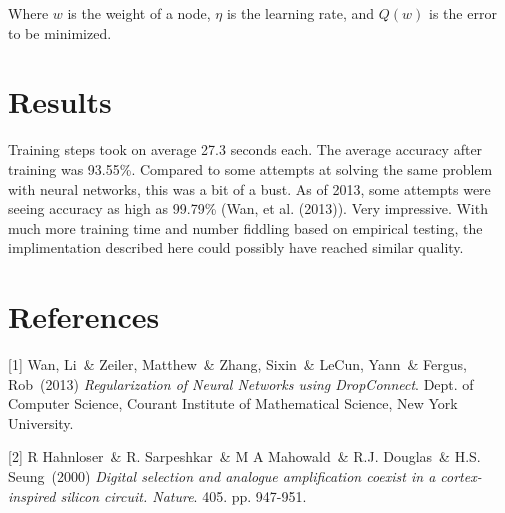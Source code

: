 \documentclass{article}
\begin{document}
Where $w$ is the weight of a node, $\eta$ is the learning rate, and $Q(w)$ is the error to be minimized.

\section{Results}

Training steps took on average 27.3 seconds each. The average accuracy after training was 93.55\%. Compared to some attempts at solving the same problem with neural networks, this was a bit of a bust. As of 2013, some attempts were seeing accuracy as high as 99.79\% (Wan, et al. (2013)). Very impressive. With much more training time and number fiddling based on empirical testing, the implimentation described here could possibly have reached similar quality.

\section*{References}

[1] Wan, Li\ \& Zeiler, Matthew\ \& Zhang, Sixin\ \& LeCun, Yann\ \& Fergus, Rob\ (2013) {\it Regularization of Neural Networks using DropConnect}. Dept. of Computer Science, Courant Institute of Mathematical Science, New York University.

[2] R Hahnloser\ \& R. Sarpeshkar\ \& M A Mahowald\ \& R.J. Douglas\ \& H.S. Seung\ (2000) {\it Digital selection and analogue amplification coexist in a cortex-inspired silicon circuit. Nature}. 405. pp. 947-951.
\end{document}
